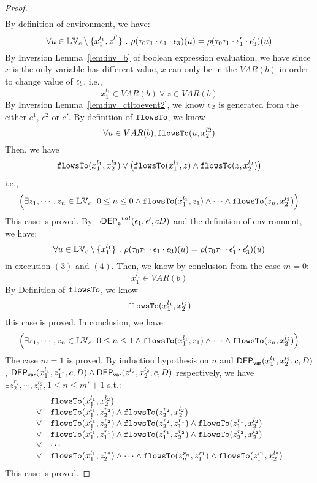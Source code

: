 \begin{proof}
\[\begin{array}{l}
\end{array}
 \]
 By definition of environment, we have:
\[
  \forall u \in \mathbb{LV}_c \setminus \{x_1^{l_1}, z^{l'}\} ~.~
  \rho(\mathtt{\tau}_0 \mathtt{\tau}_1 \cdot \mathtt{\epsilon}_1 \cdot \mathtt{\epsilon}_3 ) (u) =  
  \rho(\mathtt{\tau}_0 \mathtt{\tau}_1 \cdot \mathtt{\epsilon}_1' \cdot \mathtt{\epsilon}_3') (u)
\]
%
By {Inversion Lemma~\ref{lem:inv_b}} of boolean expression evaluation, we have since $x$ is the only variable has different value, $x$ can only be in the $VAR(b)$ in order to change value of $\mathtt{\epsilon}_b$, i.e.,
 \[
  x_1^{l_1} \in VAR(b) \lor z \in VAR(b)
 \]
 By {Inversion Lemma~\ref{lem:inv_ctltoevent2}}, we know $\mathtt{\epsilon}_2$ is generated from the either $c^1$, $c^2$ or $c'$.
 By definition of $\mathtt{flowsTo}$, we know
 \[
 \forall u \in VAR(b), \mathtt{flowsTo}(u, x_2^{l2})
 \]
 Then, we have
 \[
  \mathtt{flowsTo}(x_1^{l_1}, x_2^{l_2}) \lor 
  \big(\mathtt{flowsTo}(x_1^{l_1}, z) \land \mathtt{flowsTo}(z, x_2^{l_2}) \big)
 \]
 i.e.,
 \[
 \Big( \exists z_1, \cdots, z_n \in \mathbb{LV}_{{c}}. ~ 0 \leq n \leq 0 \land
  \mathtt{flowsTo}(x_1^{l_1}, z_1) 
  \land \cdots \land \mathtt{flowsTo}(z_n, x_2^{l_2}) \Big)
 \]
 This case is proved.
%
%
By $\neg \mathsf{DEP_{\mathtt{e}}}^{val}(\mathtt{\epsilon}_1, \mathtt{\epsilon}', c D)$ and the definition of environment, we have:
\[
  \forall u \in \mathbb{LV}_c \setminus \{x_1^{l_1}\} ~.~
  \rho(\mathtt{\tau}_0 \mathtt{\tau}_1 \cdot \mathtt{\epsilon}_1 \cdot \mathtt{\epsilon}_3 ) (u) =  
  \rho(\mathtt{\tau}_0 \mathtt{\tau}_1 \cdot \mathtt{\epsilon}_1' \cdot \mathtt{\epsilon}_3') (u)
\]
in execution $(3)$ and $(4)$.
%
Then, we know by conclusion from the case $m = 0$:
\[
  x_1^{l_1} \in VAR(b)
\]
%
By Definition of $\mathtt{flowsTo}$, we know
\[
  \mathtt{flowsTo}(x_1^{l_1}, x_2^{l_2}) 
\]
this case is proved.
%
In conclusion, we have:
\[
  \Big( \exists z_1, \cdots, z_n \in \mathbb{LV}_{{c}}. ~ 0 \leq n \leq 1 \land
  \mathtt{flowsTo}(x_1^{l_1}, z_1) 
  \land \cdots \land \mathtt{flowsTo}(z_n, x_2^{l_2}) \Big)
\]
The case $m = 1$ is proved.
%
By induction hypothesis on $n$ and $\mathsf{DEP_{var}}(x_1^{l_1}, x_2^{l_2}, c, D)$, 
$\mathsf{DEP_{var}}(x_1^{l_1}, z_1^{r_1}, c, D) \land \mathsf{DEP_{var}}(z^{l_z}, x_2^{l_2}, c, D)$ respectively, 
we have $\exists z_2^{r_2}, \cdots, z_n^{r_2}, 1 \leq n \leq m'+1$ s.t.:
\[
\begin{array}{ll}
      & \mathtt{flowsTo}(x_1^{l_1}, x_2^{l_2}) \\
  \lor  & \mathtt{flowsTo}(x_1^{l_1}, z_2^{r_2}) \land \mathtt{flowsTo}(z_2^{r_2}, x_2^{l_2})\\
  \lor  & \mathtt{flowsTo}(x_1^{l_1}, z_2^{r_2}) \land \mathtt{flowsTo}(z_2^{r_2}, z_1^{r_1}) \land \mathtt{flowsTo}(z_1^{r_1}, x_2^{l_2}) \\
  \lor  & \mathtt{flowsTo}(x_1^{l_1}, z_1^{r_1}) \land \mathtt{flowsTo}(z_1^{r_1}, z_2^{r_2}) \land \mathtt{flowsTo}(z_2^{r_2}, x_2^{l_2}) \\
  \lor  & \cdots \\
  \lor  & \mathtt{flowsTo}(x_1^{l_1}, z_2^{r_2}) \land \cdots \land \mathtt{flowsTo}(z_n^{r_n}, z_1^{r_1}) \land \mathtt{flowsTo}(z_1^{r_1}, x_2^{l_2}) \\
\end{array}
\]This case is proved.
\end{proof}